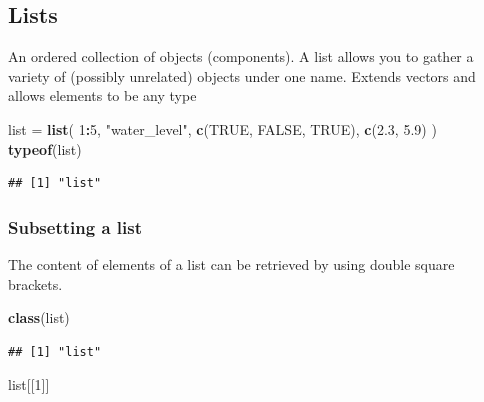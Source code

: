 \documentclass[
]{article}
\newenvironment{Shaded}{\begin{snugshade}}{\end{snugshade}}
\newcommand{\DecValTok}[1]{\textcolor[rgb]{0.00,0.00,0.81}{#1}}
\newcommand{\FloatTok}[1]{\textcolor[rgb]{0.00,0.00,0.81}{#1}}
\newcommand{\KeywordTok}[1]{\textcolor[rgb]{0.13,0.29,0.53}{\textbf{#1}}}
\newcommand{\NormalTok}[1]{#1}
\newcommand{\OperatorTok}[1]{\textcolor[rgb]{0.81,0.36,0.00}{\textbf{#1}}}
\newcommand{\OtherTok}[1]{\textcolor[rgb]{0.56,0.35,0.01}{#1}}
\newcommand{\StringTok}[1]{\textcolor[rgb]{0.31,0.60,0.02}{#1}}
\begin{document}
\hypertarget{lists}{%
\subsection{\texorpdfstring{\textbf{Lists}}{Lists}}\label{lists}}

An ordered collection of objects (components). A list allows you to
gather a variety of (possibly unrelated) objects under one name. Extends
vectors and allows elements to be any type

\begin{Shaded}
\begin{Highlighting}[]
\NormalTok{list =}\StringTok{ }\KeywordTok{list}\NormalTok{(}
  \DecValTok{1}\OperatorTok{:}\DecValTok{5}\NormalTok{, }
  \StringTok{"water_level"}\NormalTok{, }
  \KeywordTok{c}\NormalTok{(}\OtherTok{TRUE}\NormalTok{, }\OtherTok{FALSE}\NormalTok{, }\OtherTok{TRUE}\NormalTok{), }
  \KeywordTok{c}\NormalTok{(}\FloatTok{2.3}\NormalTok{, }\FloatTok{5.9}\NormalTok{)}
\NormalTok{)}
\KeywordTok{typeof}\NormalTok{(list)}
\end{Highlighting}
\end{Shaded}

\begin{verbatim}
## [1] "list"
\end{verbatim}

\hypertarget{subsetting-a-list}{%
\subsubsection{\texorpdfstring{\textbf{Subsetting a
list}}{Subsetting a list}}\label{subsetting-a-list}}

The content of elements of a list can be retrieved by using double
square brackets.

\begin{Shaded}
\begin{Highlighting}[]
\KeywordTok{class}\NormalTok{(list)}
\end{Highlighting}
\end{Shaded}

\begin{verbatim}
## [1] "list"
\end{verbatim}

\begin{Shaded}
\begin{Highlighting}[]
\NormalTok{list[[}\DecValTok{1}\NormalTok{]]}
\end{Highlighting}
\end{Shaded}
\end{document}
